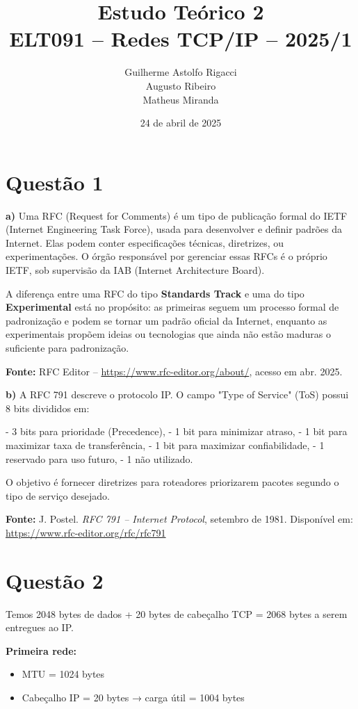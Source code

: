 \documentclass[12pt]{article}
\title{Estudo Teórico 2 \\ \large ELT091 – Redes TCP/IP – 2025/1}
\author{
Guilherme Astolfo Rigacci \\
Augusto Ribeiro \\
Matheus Miranda
}
\date{24 de abril de 2025}
\begin{document}
\maketitle

\section*{Questão 1}

\textbf{a)} Uma RFC (Request for Comments) é um tipo de publicação formal do IETF (Internet Engineering Task Force), usada para desenvolver e definir padrões da Internet. Elas podem conter especificações técnicas, diretrizes, ou experimentações. O órgão responsável por gerenciar essas RFCs é o próprio IETF, sob supervisão da IAB (Internet Architecture Board). 

A diferença entre uma RFC do tipo \textbf{Standards Track} e uma do tipo \textbf{Experimental} está no propósito: as primeiras seguem um processo formal de padronização e podem se tornar um padrão oficial da Internet, enquanto as experimentais propõem ideias ou tecnologias que ainda não estão maduras o suficiente para padronização. 

\textbf{Fonte:} RFC Editor – \url{https://www.rfc-editor.org/about/}, acesso em abr. 2025.

\vspace{0.5em}
\textbf{b)} A RFC 791 descreve o protocolo IP. O campo "Type of Service" (ToS) possui 8 bits divididos em:

- 3 bits para prioridade (Precedence),
- 1 bit para minimizar atraso,
- 1 bit para maximizar taxa de transferência,
- 1 bit para maximizar confiabilidade,
- 1 reservado para uso futuro,
- 1 não utilizado.

O objetivo é fornecer diretrizes para roteadores priorizarem pacotes segundo o tipo de serviço desejado.

\textbf{Fonte:} J. Postel. \textit{RFC 791 – Internet Protocol}, setembro de 1981. Disponível em: \url{https://www.rfc-editor.org/rfc/rfc791}

\section*{Questão 2}

Temos 2048 bytes de dados + 20 bytes de cabeçalho TCP = 2068 bytes a serem entregues ao IP.

\vspace{0.5em}
\textbf{Primeira rede:}
\begin{itemize}
    \item MTU = 1024 bytes
    \item Cabeçalho IP = 20 bytes → carga útil = 1004 bytes
\end{itemize}
\end{document}
